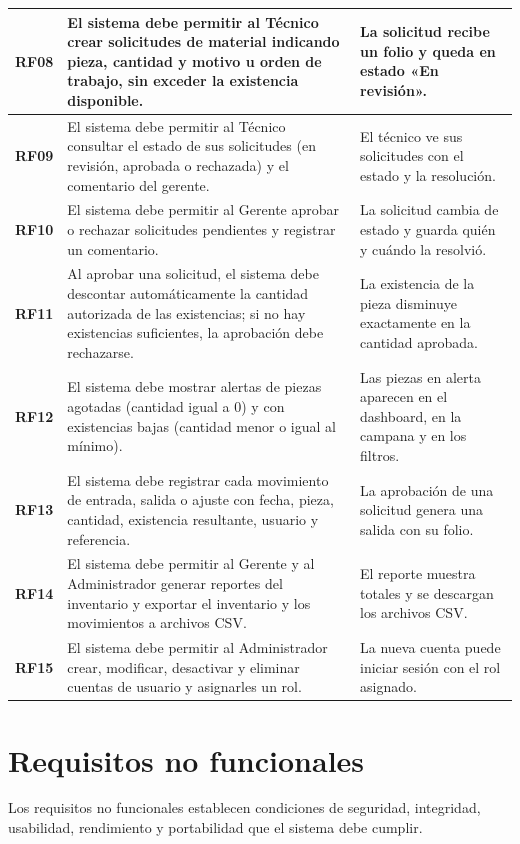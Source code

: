 \documentclass[12pt,letterpaper]{article}
\begin{document}
\begin{longtable}{|>{\bfseries}p{1.3cm}|p{8.3cm}|p{5.2cm}|}
RF08 & El sistema debe permitir al Técnico crear solicitudes de material indicando pieza, cantidad y motivo u orden de trabajo, sin exceder la existencia disponible. & La solicitud recibe un folio y queda en estado «En revisión». \\ \hline
RF09 & El sistema debe permitir al Técnico consultar el estado de sus solicitudes (en revisión, aprobada o rechazada) y el comentario del gerente. & El técnico ve sus solicitudes con el estado y la resolución. \\ \hline
RF10 & El sistema debe permitir al Gerente aprobar o rechazar solicitudes pendientes y registrar un comentario. & La solicitud cambia de estado y guarda quién y cuándo la resolvió. \\ \hline
RF11 & Al aprobar una solicitud, el sistema debe descontar automáticamente la cantidad autorizada de las existencias; si no hay existencias suficientes, la aprobación debe rechazarse. & La existencia de la pieza disminuye exactamente en la cantidad aprobada. \\ \hline
RF12 & El sistema debe mostrar alertas de piezas agotadas (cantidad igual a 0) y con existencias bajas (cantidad menor o igual al mínimo). & Las piezas en alerta aparecen en el dashboard, en la campana y en los filtros. \\ \hline
RF13 & El sistema debe registrar cada movimiento de entrada, salida o ajuste con fecha, pieza, cantidad, existencia resultante, usuario y referencia. & La aprobación de una solicitud genera una salida con su folio. \\ \hline
RF14 & El sistema debe permitir al Gerente y al Administrador generar reportes del inventario y exportar el inventario y los movimientos a archivos CSV. & El reporte muestra totales y se descargan los archivos CSV. \\ \hline
RF15 & El sistema debe permitir al Administrador crear, modificar, desactivar y eliminar cuentas de usuario y asignarles un rol. & La nueva cuenta puede iniciar sesión con el rol asignado. \\ \hline
\end{longtable}

\section{Requisitos no funcionales}

Los requisitos no funcionales establecen condiciones de seguridad, integridad, usabilidad, rendimiento y portabilidad que el sistema debe cumplir.
\end{document}
